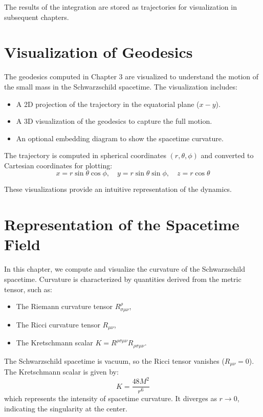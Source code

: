 \documentclass[12pt]{article}
\begin{document}
The results of the integration are stored as trajectories for visualization in subsequent chapters.


\section{Visualization of Geodesics}

The geodesics computed in Chapter 3 are visualized to understand the motion of the small mass in the Schwarzschild spacetime. The visualization includes:
\begin{itemize}
    \item A 2D projection of the trajectory in the equatorial plane (\(x-y\)).
    \item A 3D visualization of the geodesics to capture the full motion.
    \item An optional embedding diagram to show the spacetime curvature.
\end{itemize}

The trajectory is computed in spherical coordinates \((r, \theta, \phi)\) and converted to Cartesian coordinates for plotting:
\[
x = r \sin\theta \cos\phi, \quad y = r \sin\theta \sin\phi, \quad z = r \cos\theta
\]

These visualizations provide an intuitive representation of the dynamics.


\section{Representation of the Spacetime Field}

In this chapter, we compute and visualize the curvature of the Schwarzschild spacetime. Curvature is characterized by quantities derived from the metric tensor, such as:
\begin{itemize}
    \item The Riemann curvature tensor \(R^\rho_{\sigma\mu\nu}\),
    \item The Ricci curvature tensor \(R_{\mu\nu}\),
    \item The Kretschmann scalar \(K = R^{\rho\sigma\mu\nu} R_{\rho\sigma\mu\nu}\).
\end{itemize}

The Schwarzschild spacetime is vacuum, so the Ricci tensor vanishes (\(R_{\mu\nu} = 0\)). The Kretschmann scalar is given by:
\[
K = \frac{48M^2}{r^6}
\]
which represents the intensity of spacetime curvature. It diverges as \(r \to 0\), indicating the singularity at the center.
\end{document}

